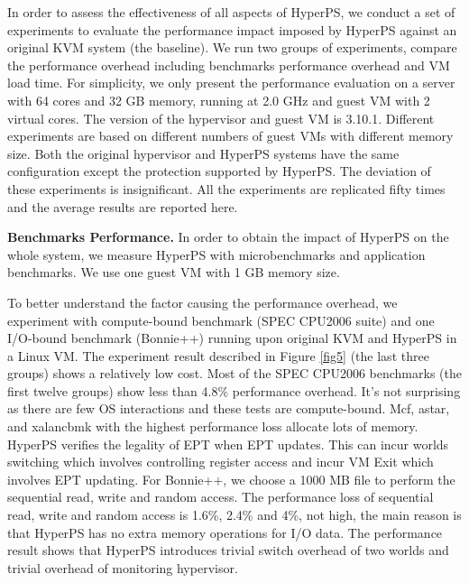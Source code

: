 ﻿\documentclass[conference]{IEEEtran}
\begin{document}
In order to assess the effectiveness of all aspects of HyperPS, we conduct a set of experiments to evaluate the performance impact imposed by HyperPS against an original KVM system (the baseline). We run two groups of experiments, compare the performance overhead including benchmarks performance overhead and VM load time.
For simplicity, we only present the performance evaluation on a server with 64 cores and 32 GB memory, running at 2.0 GHz and guest VM with 2 virtual cores. The version of the hypervisor and guest VM is 3.10.1. Different experiments are based on different numbers of guest VMs with different memory size. Both the original hypervisor and HyperPS systems have the same configuration except the protection supported by HyperPS. The deviation of these experiments is insignificant. All the experiments are replicated fifty times and the average results are reported here.



\textbf{Benchmarks Performance.}
In order to obtain the impact of HyperPS on the whole system, we measure HyperPS with microbenchmarks and application benchmarks. 
We use one guest VM with 1 GB memory size. 

To better understand the factor causing the performance overhead, we experiment with compute-bound benchmark (SPEC CPU2006 suite) and one I/O-bound benchmark (Bonnie++) running upon original KVM and HyperPS in a Linux VM. The experiment result described in Figure \ref{fig5} (the last three groups) shows a relatively low cost. Most of the SPEC CPU2006 benchmarks (the first twelve groups) show less than 4.8\% performance overhead. It's not surprising as there are few OS interactions and these tests are compute-bound. Mcf, astar, and xalancbmk with the highest performance loss allocate lots of memory. HyperPS verifies the legality of EPT when EPT updates. This can incur worlds switching which involves controlling register access and incur VM Exit which involves EPT updating.
 For Bonnie++, we choose a 1000 MB file to perform the sequential read, write and random access. The performance loss of sequential read, write and random access is 1.6\%, 2.4\% and 4\%, not high, the main reason is that HyperPS has no extra memory operations for I/O data. The performance result shows that HyperPS introduces trivial switch overhead of two worlds and trivial overhead of monitoring hypervisor.
\end{document}
